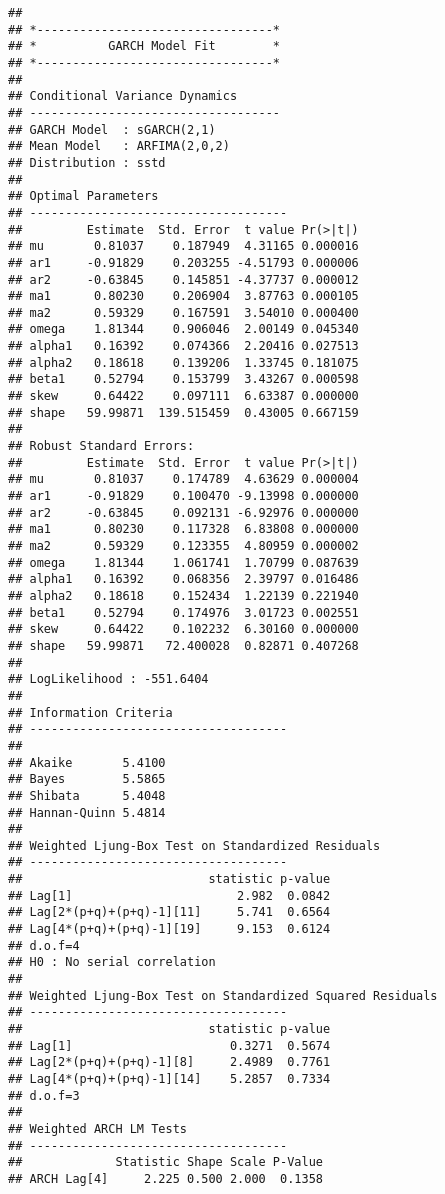 \documentclass[]{article}
\begin{document}
\begin{verbatim}
## 
## *---------------------------------*
## *          GARCH Model Fit        *
## *---------------------------------*
## 
## Conditional Variance Dynamics    
## -----------------------------------
## GARCH Model  : sGARCH(2,1)
## Mean Model   : ARFIMA(2,0,2)
## Distribution : sstd 
## 
## Optimal Parameters
## ------------------------------------
##         Estimate  Std. Error  t value Pr(>|t|)
## mu       0.81037    0.187949  4.31165 0.000016
## ar1     -0.91829    0.203255 -4.51793 0.000006
## ar2     -0.63845    0.145851 -4.37737 0.000012
## ma1      0.80230    0.206904  3.87763 0.000105
## ma2      0.59329    0.167591  3.54010 0.000400
## omega    1.81344    0.906046  2.00149 0.045340
## alpha1   0.16392    0.074366  2.20416 0.027513
## alpha2   0.18618    0.139206  1.33745 0.181075
## beta1    0.52794    0.153799  3.43267 0.000598
## skew     0.64422    0.097111  6.63387 0.000000
## shape   59.99871  139.515459  0.43005 0.667159
## 
## Robust Standard Errors:
##         Estimate  Std. Error  t value Pr(>|t|)
## mu       0.81037    0.174789  4.63629 0.000004
## ar1     -0.91829    0.100470 -9.13998 0.000000
## ar2     -0.63845    0.092131 -6.92976 0.000000
## ma1      0.80230    0.117328  6.83808 0.000000
## ma2      0.59329    0.123355  4.80959 0.000002
## omega    1.81344    1.061741  1.70799 0.087639
## alpha1   0.16392    0.068356  2.39797 0.016486
## alpha2   0.18618    0.152434  1.22139 0.221940
## beta1    0.52794    0.174976  3.01723 0.002551
## skew     0.64422    0.102232  6.30160 0.000000
## shape   59.99871   72.400028  0.82871 0.407268
## 
## LogLikelihood : -551.6404 
## 
## Information Criteria
## ------------------------------------
##                    
## Akaike       5.4100
## Bayes        5.5865
## Shibata      5.4048
## Hannan-Quinn 5.4814
## 
## Weighted Ljung-Box Test on Standardized Residuals
## ------------------------------------
##                          statistic p-value
## Lag[1]                       2.982  0.0842
## Lag[2*(p+q)+(p+q)-1][11]     5.741  0.6564
## Lag[4*(p+q)+(p+q)-1][19]     9.153  0.6124
## d.o.f=4
## H0 : No serial correlation
## 
## Weighted Ljung-Box Test on Standardized Squared Residuals
## ------------------------------------
##                          statistic p-value
## Lag[1]                      0.3271  0.5674
## Lag[2*(p+q)+(p+q)-1][8]     2.4989  0.7761
## Lag[4*(p+q)+(p+q)-1][14]    5.2857  0.7334
## d.o.f=3
## 
## Weighted ARCH LM Tests
## ------------------------------------
##             Statistic Shape Scale P-Value
## ARCH Lag[4]     2.225 0.500 2.000  0.1358

\end{verbatim}
\end{document}
